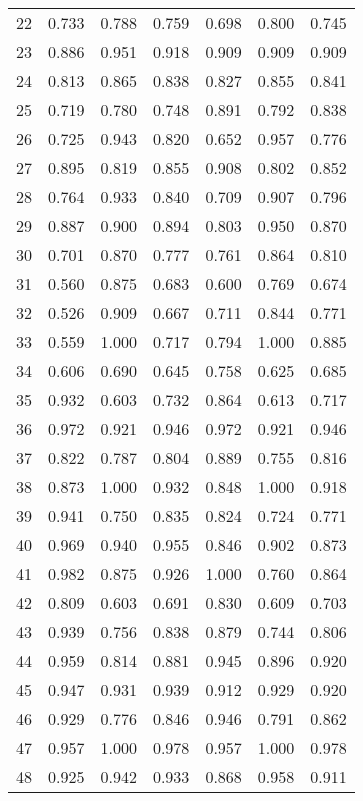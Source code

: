 \begin{table}[H]
\begin{tabular}{lcccccc}
    22 & 0.733 & 0.788 & 0.759 & 0.698 & 0.800 & 0.745 \\
    23 & 0.886 & 0.951 & 0.918 & 0.909 & 0.909 & 0.909 \\
    24 & 0.813 & 0.865 & 0.838 & 0.827 & 0.855 & 0.841 \\
    25 & 0.719 & 0.780 & 0.748 & 0.891 & 0.792 & 0.838 \\
    26 & 0.725 & 0.943 & 0.820 & 0.652 & 0.957 & 0.776 \\
    27 & 0.895 & 0.819 & 0.855 & 0.908 & 0.802 & 0.852 \\
    28 & 0.764 & 0.933 & 0.840 & 0.709 & 0.907 & 0.796 \\
    29 & 0.887 & 0.900 & 0.894 & 0.803 & 0.950 & 0.870 \\
    30 & 0.701 & 0.870 & 0.777 & 0.761 & 0.864 & 0.810 \\
    31 & 0.560 & 0.875 & 0.683 & 0.600 & 0.769 & 0.674 \\
    32 & 0.526 & 0.909 & 0.667 & 0.711 & 0.844 & 0.771 \\
    33 & 0.559 & 1.000 & 0.717 & 0.794 & 1.000 & 0.885 \\
    34 & 0.606 & 0.690 & 0.645 & 0.758 & 0.625 & 0.685 \\
    35 & 0.932 & 0.603 & 0.732 & 0.864 & 0.613 & 0.717 \\
    36 & 0.972 & 0.921 & 0.946 & 0.972 & 0.921 & 0.946 \\
    37 & 0.822 & 0.787 & 0.804 & 0.889 & 0.755 & 0.816 \\
    38 & 0.873 & 1.000 & 0.932 & 0.848 & 1.000 & 0.918 \\
    39 & 0.941 & 0.750 & 0.835 & 0.824 & 0.724 & 0.771 \\
    40 & 0.969 & 0.940 & 0.955 & 0.846 & 0.902 & 0.873 \\
    41 & 0.982 & 0.875 & 0.926 & 1.000 & 0.760 & 0.864 \\
    42 & 0.809 & 0.603 & 0.691 & 0.830 & 0.609 & 0.703 \\
    43 & 0.939 & 0.756 & 0.838 & 0.879 & 0.744 & 0.806 \\
    44 & 0.959 & 0.814 & 0.881 & 0.945 & 0.896 & 0.920 \\
    45 & 0.947 & 0.931 & 0.939 & 0.912 & 0.929 & 0.920 \\
    46 & 0.929 & 0.776 & 0.846 & 0.946 & 0.791 & 0.862 \\
    47 & 0.957 & 1.000 & 0.978 & 0.957 & 1.000 & 0.978 \\
    48 & 0.925 & 0.942 & 0.933 & 0.868 & 0.958 & 0.911 \\

\end{tabular}
\end{table}

